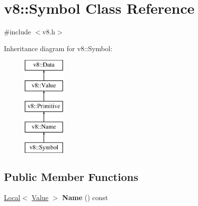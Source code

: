\hypertarget{classv8_1_1Symbol}{}\section{v8\+:\+:Symbol Class Reference}
\label{classv8_1_1Symbol}


{\ttfamily \#include $<$v8.\+h$>$}

Inheritance diagram for v8\+:\+:Symbol\+:\begin{figure}[H]
\begin{center}
\leavevmode
\includegraphics[height=5.000000cm]{classv8_1_1Symbol}
\end{center}
\end{figure}
\subsection*{Public Member Functions}
\begin{DoxyCompactItemize}
\item 
\hyperlink{classv8_1_1Local}{Local}$<$ \hyperlink{classv8_1_1Value}{Value} $>$ {\bfseries Name} () const \hypertarget{classv8_1_1Symbol_af1c1ccf079ac99e0db858c30e6458587}{}\label{classv8_1_1Symbol_af1c1ccf079ac99e0db858c30e6458587}

\end{DoxyCompactItemize}
